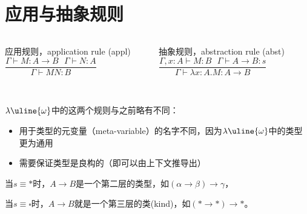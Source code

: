 \documentclass[UTF8,aspectratio=169,mathserif]{beamer}
\begin{document}
	\section{应用与抽象规则}
		\begin{frame}
			\begin{columns}
				\begin{column}{0.48\textwidth}
					\begin{exampleblock}{应用规则，application rule}
						(appl) $\dfrac{\Gamma\vdash M:A\rightarrow B\ \ \ \Gamma\vdash N:A}{\Gamma\vdash MN:B}$
					\end{exampleblock}
				\end{column}
				\begin{column}{0.48\textwidth}
					\begin{exampleblock}{抽象规则，abstraction rule}
						(abst) $\dfrac{\Gamma,x:A\vdash M:B\ \ \ \Gamma\vdash A\rightarrow B:s}{\Gamma\vdash\lambda x:A.M:A\rightarrow B}$
					\end{exampleblock}
				\end{column}
			\end{columns}
		
			\hspace*{\fill} \\
			
			$\lambda{\uline{\omega}}$中的这两个规则与之前略有不同：
			
			\begin{itemize}
				\item 用于类型的元变量（meta-variable）的名字不同，因为$\lambda{\uline{\omega}}$中的类型更为通用
				
				\item 需要保证类型是良构的（即可以由上下文推导出）
			\end{itemize}
			
			当$s\equiv*$时，$A\rightarrow B$是一个第二层的类型，如$(\alpha\rightarrow\beta)\rightarrow\gamma$，
			
			当$s\equiv\square$时，$A\rightarrow B$就是一个第三层的类(kind)，如$(*\rightarrow*)\rightarrow*$。
		\end{frame}
\end{document}
